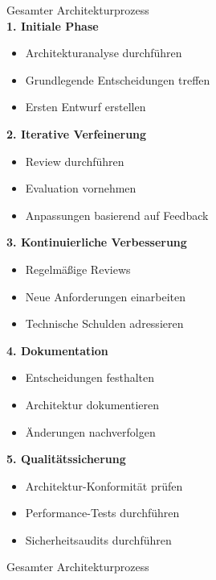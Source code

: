 \begin{KR}{Gesamter Architekturprozess}\\
\textbf{1. Initiale Phase}
\begin{itemize}
    \item Architekturanalyse durchführen
    \item Grundlegende Entscheidungen treffen
    \item Ersten Entwurf erstellen
\end{itemize}

\textbf{2. Iterative Verfeinerung}
\begin{itemize}
    \item Review durchführen
    \item Evaluation vornehmen
    \item Anpassungen basierend auf Feedback
\end{itemize}

\textbf{3. Kontinuierliche Verbesserung}
\begin{itemize}
    \item Regelmäßige Reviews
    \item Neue Anforderungen einarbeiten
    \item Technische Schulden adressieren
\end{itemize}

\textbf{4. Dokumentation}
\begin{itemize}
    \item Entscheidungen festhalten
    \item Architektur dokumentieren
    \item Änderungen nachverfolgen
\end{itemize}

\textbf{5. Qualitätssicherung}
\begin{itemize}
    \item Architektur-Konformität prüfen
    \item Performance-Tests durchführen
    \item Sicherheitsaudits durchführen
\end{itemize}
\end{KR}

\begin{example2}{Gesamter Architekturprozess}\\
\end{example2}


